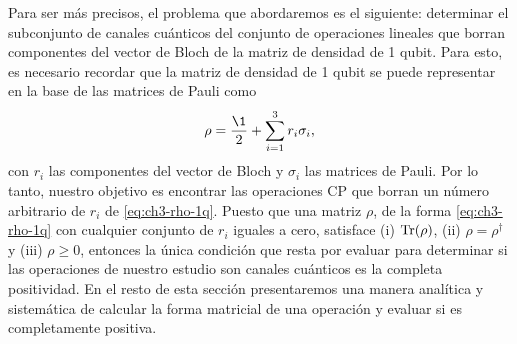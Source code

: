 Para ser más precisos, el problema que abordaremos es
el siguiente: determinar el subconjunto de canales cuánticos
del conjunto de operaciones lineales que borran componentes 
del vector de Bloch de la matriz de densidad de 1 qubit.
Para esto, es necesario recordar que la matriz de densidad 
de 1 qubit se puede representar en la base de las matrices 
de Pauli como
\begin{align}
\rho = \frac{\1}{2}+\sum_{i=1}^{3}r_i\sigma_i,
\label{eq:ch3-rho-1q}
\end{align}
con $r_i$ las componentes del vector de Bloch y $\sigma_i$ las 
matrices de Pauli. Por lo tanto, nuestro objetivo es encontrar
las operaciones CP que borran un número arbitrario de 
$r_i$ de \eqref{eq:ch3-rho-1q}. Puesto que una matriz 
$\rho$, de la forma \eqref{eq:ch3-rho-1q} con cualquier
conjunto de $r_i$ iguales a cero, satisface
(i) $\Tr(\rho)$, (ii) $\rho=\rho^{\dagger}$ y (iii) $\rho\geq0$,
entonces la única condición que resta por 
evaluar para determinar si las operaciones de nuestro estudio
son canales cuánticos es la completa positividad. 
En el resto de esta sección presentaremos una manera 
analítica y sistemática de calcular la forma matricial de una operación
y evaluar si es completamente positiva.
%
%


